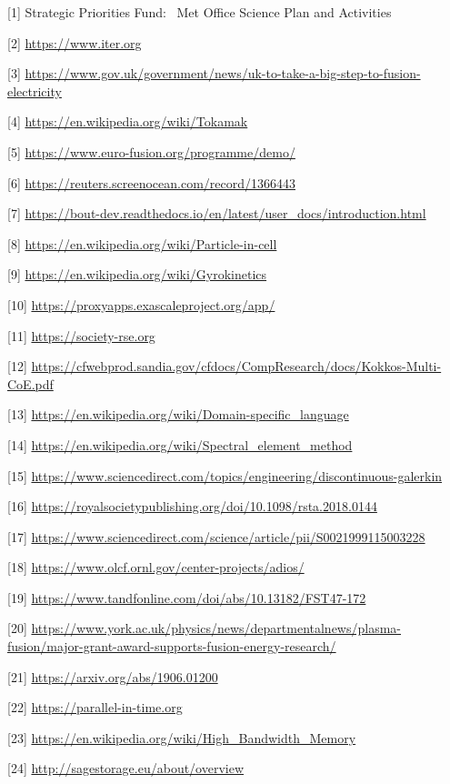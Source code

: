 [1]  Strategic Priorities Fund: \exc \   Met Office Science Plan and Activities

[2]  \url{https://www.iter.org}

[3]  \url{https://www.gov.uk/government/news/uk-to-take-a-big-step-to-fusion-electricity}

[4]  \url{https://en.wikipedia.org/wiki/Tokamak}

[5]  \url{https://www.euro-fusion.org/programme/demo/}

[6]  \url{https://reuters.screenocean.com/record/1366443}

[7]  \url{https://bout-dev.readthedocs.io/en/latest/user\_docs/introduction.html}

[8]  \url{https://en.wikipedia.org/wiki/Particle-in-cell}

[9]  \url{https://en.wikipedia.org/wiki/Gyrokinetics}

[10] \url{https://proxyapps.exascaleproject.org/app/}

[11] \url{https://society-rse.org}

[12] \url{https://cfwebprod.sandia.gov/cfdocs/CompResearch/docs/Kokkos-Multi-CoE.pdf}

[13] \url{https://en.wikipedia.org/wiki/Domain-specific\_language}

[14] \url{https://en.wikipedia.org/wiki/Spectral\_element\_method}

[15] \url{https://www.sciencedirect.com/topics/engineering/discontinuous-galerkin}

[16] \url{https://royalsocietypublishing.org/doi/10.1098/rsta.2018.0144}

[17] \url{https://www.sciencedirect.com/science/article/pii/S0021999115003228}

[18] \url{https://www.olcf.ornl.gov/center-projects/adios/}

[19] \url{https://www.tandfonline.com/doi/abs/10.13182/FST47-172}

[20] \url{https://www.york.ac.uk/physics/news/departmentalnews/plasma-fusion/major-grant-award-supports-fusion-energy-research/}

[21] \url{https://arxiv.org/abs/1906.01200}

[22] \url{https://parallel-in-time.org}

[23] \url{https://en.wikipedia.org/wiki/High\_Bandwidth\_Memory}

[24] \url{http://sagestorage.eu/about/overview}
